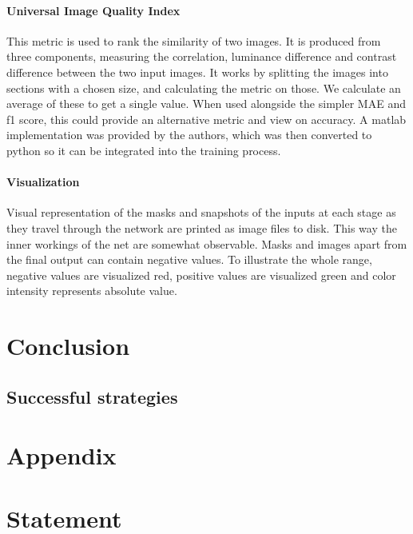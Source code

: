 \documentclass[12pt]{report}
\begin{document}
\subsubsection{Universal Image Quality Index}This metric is used to rank the similarity of two images. It is produced from three components, measuring the correlation, luminance difference and contrast difference between the two input images. It works by splitting the images into sections with a chosen size, and calculating the metric on those. We calculate an average of these to get a single value. When used alongside the simpler MAE and f1 score, this could provide an alternative metric and view on accuracy. A matlab implementation was provided by the authors, which was then converted to python so it can be integrated into the training process.
\subsubsection{Visualization}Visual representation of the masks and snapshots of the inputs at each stage as they travel through the network are printed as image files to disk. This way the inner workings of the net are somewhat observable. Masks and images apart from the final output can contain negative values. To illustrate the whole range, negative values are visualized red, positive values are visualized green and color intensity represents absolute value.
\chapter{Conclusion}
\section{Successful strategies}

\chapter{Appendix}

\chapter*{Statement}

\end{document}
